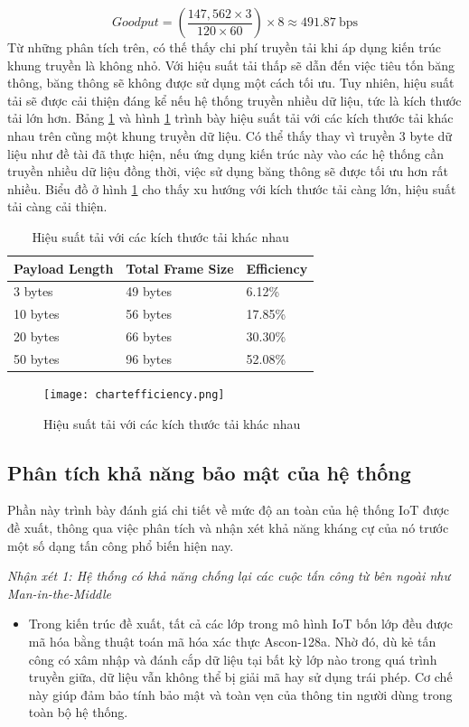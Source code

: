 \[
\textit{Goodput} = \left( \frac{147,562 \times 3}{120 \times 60} \right) \times 8 \approx 491.87 \ \text{bps}
\]
Từ những phân tích trên, có thế thấy chi phí truyền tải khi áp dụng kiến trúc khung truyền là không nhỏ. Với hiệu suất tải thấp sẽ dẫn đến việc tiêu tốn băng thông, băng thông sẽ không được sử dụng một cách tối ưu. Tuy nhiên, hiệu suất tải sẽ được cải thiện đáng kể nếu hệ thống truyền nhiều dữ liệu, tức là kích thước tải lớn hơn. Bảng \ref{tab:efficiency} và hình \ref{fig:charteff} trình bày hiệu suất tải với các kích thước tải khác nhau trên cũng một khung truyền dữ liệu. Có thể thấy thay vì truyền 3 byte dữ liệu như đề tài đã thực hiện, nếu ứng dụng kiến trúc này vào các hệ thống cần truyền nhiều dữ liệu đồng thời, việc sử dụng băng thông sẽ được tối ưu hơn rất nhiều.
Biểu đồ ở hình \ref{fig:charteff} cho thấy xu hướng với kích thước tải càng lớn, hiệu suất tải càng cải thiện.
\begin{table}[h]
\centering
\small
\caption{Hiệu suất tải với các kích thước tải khác nhau}
\label{tab:efficiency}
\begin{tabular}{|p{4cm}|p{5cm}|p{3cm}|}
\hline
Payload Length & Total Frame Size & Efficiency \\
\hline
3 bytes   & 49 bytes  & 6.12\%  \\
10 bytes  & 56 bytes & 17.85\% \\
20 bytes  & 66 bytes & 30.30\% \\
50 bytes  & 96 bytes & 52.08\% \\
\hline
\end{tabular}
\end{table}

\begin{figure}[H]
    \centering
    \texttt{[image: chartefficiency.png]}
    \caption{Hiệu suất tải với các kích thước tải khác nhau}
    \label{fig:charteff}
\end{figure}

\subsection{Phân tích khả năng bảo mật của hệ thống}
Phần này trình bày đánh giá chi tiết về mức độ an toàn của hệ thống IoT được đề xuất, thông qua việc phân tích và nhận xét khả năng kháng cự của nó trước một số dạng tấn công phổ biến hiện nay.

\textit{Nhận xét 1: Hệ thống có khả năng chống lại các cuộc tấn công từ bên ngoài như Man-in-the-Middle}
\begin{itemize}
    \item Trong kiến trúc đề xuất, tất cả các lớp trong mô hình IoT bốn lớp đều được mã hóa bằng thuật toán mã hóa xác thực Ascon-128a. Nhờ đó, dù kẻ tấn công có xâm nhập và đánh cắp dữ liệu tại bất kỳ lớp nào trong quá trình truyền giữa, dữ liệu vẫn không thể bị giải mã hay sử dụng trái phép. Cơ chế này giúp đảm bảo tính bảo mật và toàn vẹn của thông tin người dùng trong toàn bộ hệ thống.
\end{itemize}

